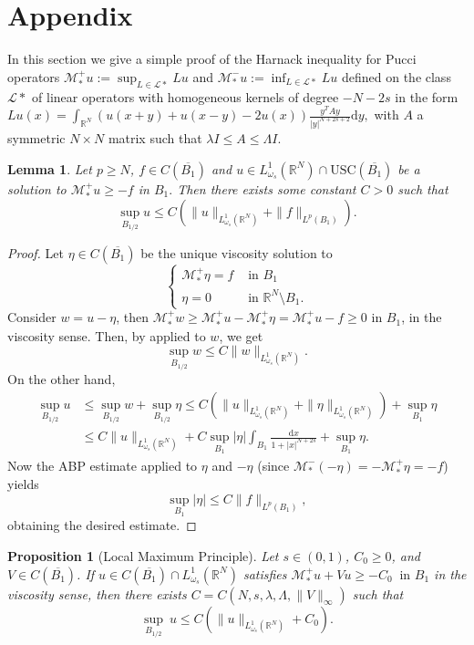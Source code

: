 \documentclass[a4paper,11pt]{article}
\newcommand{\R}{\mathbb{R}}
\newcommand{\M}{\mathcal{M}}
\newcommand{\usc}{\text{USC}}
\newcommand{\Lomega}{L_{\omega_s}^1(\R^N)}
\newcommand{\dx}{\mathrm{d}x}
\newtheorem{lemma}[theorem]{Lemma}
\newtheorem{proposition}[theorem]{Proposition}
\begin{document}
\section{Appendix}

In this section we give a simple proof of the Harnack inequality for Pucci operators $\M_*^+u :=\sup_{L\in \mathcal{L}*} Lu$ and $\M_*^-u :=\inf_{L\in \mathcal{L}*} Lu$ defined on the class $\mathcal{L}*$ of linear operators with homogeneous kernels of degree $-N-2s$  in the form
$
Lu(x) = \int_{\mathbb{R}^N} ( u(x+y)+u(x-y) -2u(x)  )\frac{y^T A y}{|y|^{N+2s+2}} \mathrm{d} y,
$
with $A$ a symmetric $N\times N$ matrix such that $\lambda I \le A\le \Lambda I$.


\begin{lemma}
	\label{prop:ABP}
	Let $p\ge N$, $f\in C(\overline{B_1})$ and $u\in \Lomega\cap \usc (\overline{B_1})$ be a solution to
$\M_*^+u \geq -f$ in $B_1.$
	Then there exists some constant $C>0$ such that 
	\[\sup_{B_{1/2}} u \leq C(\|u\|_{\Lomega} + \|f\|_{L^p(B_1)}).\]
\end{lemma}
\begin{proof}
	Let $\eta \in C(\overline{B_1})$ be the unique viscosity solution to 
	\[\begin{cases}
		\M_*^+\eta = f & \text{ in } B_1 \\
		\eta = 0 & \text{ in }\R^N \setminus B_1.
	\end{cases}\]
	Consider $w = u- \eta$, then
$\M_*^+ w \geq \M_*^+u - \M_*^+ \eta = \M_*^+u - f \geq 0$
	in $B_1$, in the viscosity sense. Then, by \cite[Theorem 3.3.5]{fernandez-real_integro-differential_2024} applied to $w$, we get
	\[ \sup_{B_{1/2}} w \leq C \|w\|_{\Lomega}.\]
	On the other hand, 
	\begin{align*}
		\sup_{B_{1/2}} u &\leq  \sup_{B_{1/2}} w + \sup_{B_{1/2}} \eta 
		\leq C(\|u\|_{\Lomega} + \|\eta\|_{\Lomega}) + \sup_{B_1} \eta \\
		&\leq C\|u\|_{\Lomega} + C\sup_{B_1} |\eta| \int_{B_1} \frac{\dx}{1+|x|^{N+2s}}  +\sup_{B_1} \eta.
	\end{align*}
Now the ABP estimate \cite[Theorem 3.1]{kitano_wsigma_2022} applied to $\eta$ and $-\eta$ (since $\M_*^-(-\eta) = -\M^+_*\eta = -f$) yields 
	\[\sup_{B_1} |\eta |\leq {C} \|f\|_{L^p(B_1)},\]
	obtaining the desired estimate.
\end{proof}
\begin{proposition}[Local Maximum Principle]
	\label{cor:localmp}
	Let $s\in (0,1)$, $C_0\geq 0$, and $V\in C(\overline{B_1})$. If $u\in C(\overline{B_1}) \cap \Lomega$ satisfies
$
		\M_*^+u + Vu \geq -C_0~\text{ in } B_1
$
	in the viscosity sense, then there exists $C = C(N, s, \lambda, \Lambda, \|V\|_\infty)$ such that
	\begin{equation*}
		\label{eq:est_localmp}
		\underset{B_{1/2}}{\sup} ~u \leq C(\|u\|_{\Lomega} + C_0).
	\end{equation*}
\end{proposition}
\end{document}
